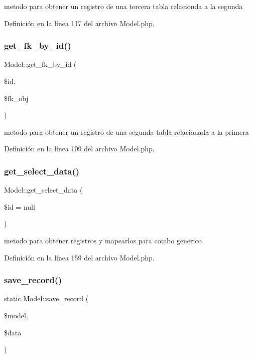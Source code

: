 metodo para obtener un registro de una tercera tabla relacionda a la segunda 

Definición en la línea 117 del archivo Model.\+php.

\mbox{\label{class_model_aca3b0fcfd538c6f2d0f1a05dfcea87ae}} 
\subsubsection{\texorpdfstring{get\_fk\_by\_id()}{get\_fk\_by\_id()}}
{\footnotesize\ttfamily Model\+::get\+\_\+fk\+\_\+by\+\_\+id (\begin{DoxyParamCaption}\item[{}]{\$id,  }\item[{}]{\$fk\+\_\+obj }\end{DoxyParamCaption})}

metodo para obtener un registro de una segunda tabla relacionada a la primera 

Definición en la línea 109 del archivo Model.\+php.

\mbox{\label{class_model_a85f2794443673870da8d4e34e1e3a307}} 
\subsubsection{\texorpdfstring{get\_select\_data()}{get\_select\_data()}}
{\footnotesize\ttfamily Model\+::get\+\_\+select\+\_\+data (\begin{DoxyParamCaption}\item[{}]{\$id = {\ttfamily null} }\end{DoxyParamCaption})}

metodo para obtener registros y mapearlos para combo generico 

Definición en la línea 159 del archivo Model.\+php.

\mbox{\label{class_model_a740d72b25fc3721184b8e304ab1d5c50}} 
\subsubsection{\texorpdfstring{save\_record()}{save\_record()}}
{\footnotesize\ttfamily static Model\+::save\+\_\+record (\begin{DoxyParamCaption}\item[{}]{\$model,  }\item[{}]{\$data }\end{DoxyParamCaption})\hspace{0.3cm}{\ttfamily [static]}}

